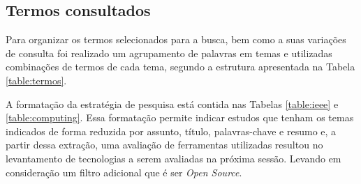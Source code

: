 \subsection{Termos consultados}
Para organizar os termos selecionados para a busca, bem como a suas variações de consulta foi realizado um agrupamento de palavras em temas e utilizadas combinações de termos de cada tema, segundo a estrutura apresentada na Tabela \ref{table:termos}.

A formatação da estratégia de pesquisa está contida nas Tabelas \ref{table:ieee} e \ref{table:computing}. Essa formatação permite indicar estudos que tenham os temas indicados de forma reduzida por assunto, título, palavras-chave e resumo e, a partir dessa extração, uma avaliação de ferramentas utilizadas resultou no levantamento de tecnologias a serem avaliadas na próxima sessão. Levando em consideração um filtro adicional que é ser \emph{Open Source}.

